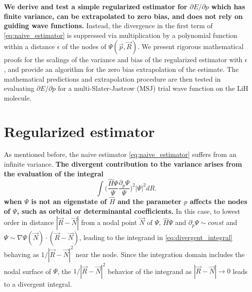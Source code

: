 \documentclass{article}
\begin{document}
\textbf{We derive and test a simple regularized estimator for $\partial E/\partial p$ which has finite variance, can be extrapolated to zero bias, and does not rely on guiding wave functions.}
Instead, the divergence in the first term of \eqref{eq:naive_estimator} is suppressed via multiplication by a polynomial function within a distance $\epsilon$ of the nodes of $\Psi(\vec{p}, \vec{R})$. 
We present rigorous mathematical proofs for the scalings of the variance and bias of the regularized estimator with $\epsilon$, and provide an algorithm for the zero bias extrapolation of the estimate.
The mathematical predictions and extrapolation procedure are then tested in evaluating $\partial E/\partial p$ for a multi-Slater-Jastrow (MSJ) trial wave function on the LiH molecule.

\section{Regularized estimator}
As mentioned before, the naive estimator \eqref{eq:naive_estimator} suffers from an infinite variance. 
\textbf{The divergent contribution to the variance arises from the evaluation of the integral
\begin{equation}
\int \Big(\frac{\hat{H}\Psi}{\Psi}\frac{\partial_p\Psi}{\Psi}\Big)^2 |\Psi|^2 dR.
\label{eq:divergent_integral}
\end{equation}
when $\Psi$ is not an eigenstate of $\hat{H}$ and the parameter $p$ affects the nodes of $\Psi$, such as orbital or determinantal coefficients.}
In this case, to lowest order in distance $|\vec{R}-\vec{N}|$ from a nodal point $\vec{N}$ of $\Psi$, $\hat{H}\Psi$ and $\partial_p \Psi \sim const$ and $\Psi \sim \nabla \Psi(\vec{N}) \cdot (\vec{R} - \vec{N})$, leading to the integrand in \eqref{eq:divergent_integral} behaving as $1/|\vec{R}-\vec{N}|^2$ near the node.
Since the integration domain includes the nodal surface of $\Psi$, the $1/|\vec{R}-\vec{N}|^2$ behavior of the integrand as $|\vec{R}-\vec{N}|\rightarrow 0$ leads to a divergent integral.
\end{document}
